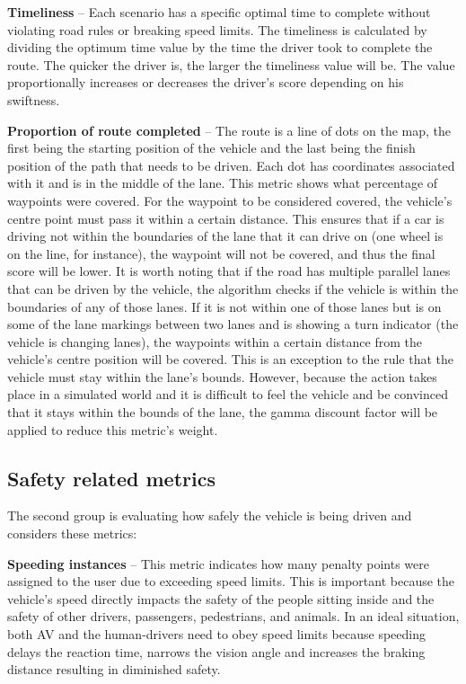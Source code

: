 \textbf{Timeliness} --
Each scenario has a specific optimal time to complete without violating road rules or breaking speed limits. The timeliness is calculated by dividing the optimum time value by the time the driver took to complete the route. The quicker the driver is, the larger the timeliness value will be. The value proportionally increases or decreases the driver's score depending on his swiftness.

\textbf{Proportion of route completed} --
The route is a line of dots on the map, the first being the starting position of the vehicle and the last being the finish position of the path that needs to be driven. Each dot has coordinates associated with it and is in the middle of the lane. This metric shows what percentage of waypoints were covered. For the waypoint to be considered covered, the vehicle's centre point must pass it within a certain distance. This ensures that if a car is driving not within the boundaries of the lane that it can drive on (one wheel is on the line, for instance), the waypoint will not be covered, and thus the final score will be lower. It is worth noting that if the road has multiple parallel lanes that can be driven by the vehicle, the algorithm checks if the vehicle is within the boundaries of any of those lanes. If it is not within one of those lanes but is on some of the lane markings between two lanes and is showing a turn indicator (the vehicle is changing lanes), the waypoints within a certain distance from the vehicle's centre position will be covered. This is an exception to the rule that the vehicle must stay within the lane's bounds. However, because the action takes place in a simulated world and it is difficult to feel the vehicle and be convinced that it stays within the bounds of the lane, the gamma discount factor will be applied to reduce this metric's weight.

\subsection{Safety related metrics} \label{sect-6.2.2}
The second group is evaluating how safely the vehicle is being driven and considers these metrics:

\textbf{Speeding instances} --
This metric indicates how many penalty points were assigned to the user due to exceeding speed limits. This is important because the vehicle's speed directly impacts the safety of the people sitting inside and the safety of other drivers, passengers, pedestrians, and animals. In an ideal situation, both AV and the human-drivers need to obey speed limits because speeding delays the reaction time, narrows the vision angle and increases the braking distance resulting in diminished safety.

